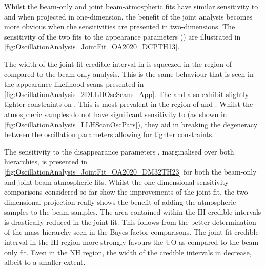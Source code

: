 Whilst the beam-only and joint beam-atmospheric fits have similar sensitivity to  and  when projected in one-dimension, the benefit of the joint analysis becomes more obvious when the sensitivities are presented in two-dimensions. The sensitivity of the two fits to the appearance parameters () are illustrated in \autoref{fig:OscillationAnalysis_JointFit_OA2020_DCPTH13}.

The width of the  joint fit credible interval in  is squeezed in the region of  compared to the beam-only analysis. This is the same behaviour that is seen in the appearance likelihood scans presented in \autoref{fig:OscillationAnalysis_2DLLHOscScans_App}. The \quickmath{1\sigma} and  also exhibit slightly tighter constraints on . This is most prevalent in the region of  and . Whilst the atmospheric samples do not have significant sensitivity to  (as shown in \autoref{fig:OscillationAnalysis_LLHScanOscPars}), they aid in breaking the degeneracy between the oscillation parameters allowing for tighter constraints.

The sensitivity to the disappearance parameters , marginalised over both hierarchies, is presented in \autoref{fig:OscillationAnalysis_JointFit_OA2020_DM32TH23} for both the beam-only and joint beam-atmospheric fits. Whilst the one-dimensional sensitivity comparisons considered so far show the improvements of the joint fit, the two-dimensional projection really shows the benefit of adding the atmospheric samples to the beam samples. The area contained within the IH credible intervals is drastically reduced in the joint fit. This follows from the better determination of the mass hierarchy seen in the Bayes factor comparisons. The \quickmath{1\sigma} joint fit credible interval in the IH region more strongly favours the UO as compared to the beam-only fit. Even in the NH region, the width of the credible intervals in  decrease, albeit to a smaller extent.

